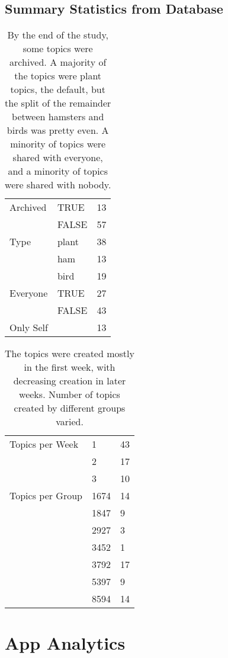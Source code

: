 \subsection{Summary Statistics from Database}
    \renewcommand{\arraystretch}{1.2}
    \begin{table}[H]
    \centering
    \begin{tabular}{ l  l  l }
    Archived & TRUE & 13 \\
     & FALSE & 57 \\
    \hline
    Type & plant & 38 \\
    & ham & 13 \\
    & bird & 19 \\
    \hline
    Everyone & TRUE & 27 \\
    & FALSE & 43 \\
    Only Self& & 13 \\
    \end{tabular}
    \caption[Topic Features]{
    By the end of the study, some topics were archived.
    A majority of the topics were plant topics, the default,
    but the split of the remainder between hamsters and birds was pretty even.
    A minority of topics were shared with everyone,
    and a minority of topics were shared with nobody.}
    \label{fig:api_table}
    \end{table}

    \renewcommand{\arraystretch}{1.2}
    \begin{table}[H]
    \centering
    \begin{tabular}{ l  l  l }
    Topics per Week & 1 & 43 \\
    &2 & 17 \\
    &3 & 10 \\
    \hline
    Topics per Group & 1674 &14 \\
    &1847 & 9\\
    &2927 & 3\\
    &3452 & 1\\
    &3792 & 17\\
    &5397&9\\
    &8594&14
    \end{tabular}
    \caption[Topic Distribution by Week and Group]{
    The topics were created mostly in the first week,
    with decreasing creation in later weeks.
    Number of topics created by different groups varied.}
    \label{fig:api_table}
    \end{table}

\section{App Analytics}

\clearpage
\newpage
